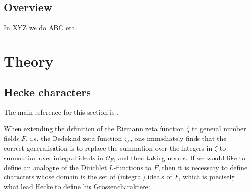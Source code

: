 \documentclass[11pt,a4paper]{article}
\renewcommand{\O}{\mathscr{O}}
\theoremstyle{plain}
\theoremstyle{definition}
\theoremstyle{remark}
\numberwithin{equation}{section}
\begin{document}
 \subsection{Overview}
 \label{sec:overview}
In XYZ we do ABC etc.

\section{Theory}
\label{sec:Theory}

\subsection{Hecke characters}
The main reference for this section is \cite{miyake1989}.

When extending the definition of the Riemann zeta function $\zeta$ to
general number fields $F$, i.e. the Dedekind zeta function
$\zeta_{F}$, one immediately finds that the correct generalisation is to
replace the summation over the integers in $\zeta$ to summation over
integral ideals in $\O_{F}$, and then taking norms. If we would like
to define an analogue of the Dirichlet $L$-functions to $F$, then it
is necessary to define characters whose domain is the set of
(integral) ideals of $F$, which is precisely what lead Hecke to define
his Grössencharaktere:
\end{document}
